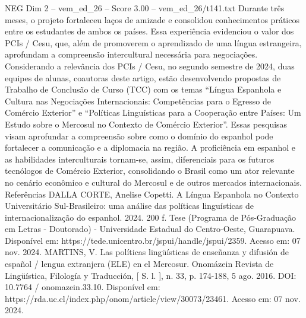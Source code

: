 \begin{textsample}{NEG Dim 2 – vem\_ed\_26 – Score 3.00 – vem\_ed\_26/t141.txt}
Durante três meses, o projeto fortaleceu laços de amizade e consolidou conhecimentos práticos entre os estudantes de ambos os países.
Essa experiência evidenciou o valor dos PCIs / Cesu, que, além de promoverem o aprendizado de uma língua estrangeira, aprofundam a compreensão intercultural necessária para negociações.
Considerando a relevância dos PCIs / Cesu, no segundo semestre de 2024, duas equipes de alunas, coautoras deste artigo, estão desenvolvendo propostas de Trabalho de Conclusão de Curso (TCC) com os temas “Língua Espanhola e Cultura nas Negociações Internacionais: Competências para o Egresso de Comércio Exterior” e “Políticas Linguísticas para a Cooperação entre Países: Um Estudo sobre o Mercosul no Contexto de Comércio Exterior”.
Essas pesquisas visam aprofundar a compreensão sobre como o domínio do espanhol pode fortalecer a comunicação e a diplomacia na região.
A proficiência em espanhol e as habilidades interculturais tornam-se, assim, diferenciais para os futuros tecnólogos de Comércio Exterior, consolidando o Brasil como um ator relevante no cenário econômico e cultural do Mercosul e de outros mercados internacionais.
Referências DALLA CORTE, Anelise Copetti.
A Língua Espanhola no Contexto Universitário Sul-Brasileiro: uma análise das políticas linguísticas de internacionalização do espanhol. 2024. 200 f.
Tese (Programa de Pós-Graduação em Letras - Doutorado) - Universidade Estadual do Centro-Oeste, Guarapuava.
Disponível em: https://tede.unicentro.br/jspui/handle/jspui/2359.
Acesso em: 07 nov. 2024.
MARTINS, V.
Las políticas lingüísticas de enseñanza y difusión de español / lengua extranjera (ELE) en el Mercosur.
Onomázein Revista de Lingüística, Filología y Traducción, [ S. l. ], n. 33, p. 174-188, 5 ago. 2016.
DOI: 10.7764 / onomazein.33.10.
Disponível em: https://rda.uc.cl/index.php/onom/article/view/30073/23461.
Acesso em: 07 nov. 2024.

\end{textsample}
